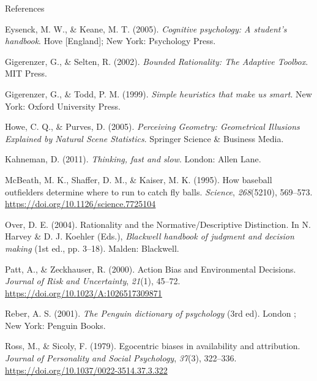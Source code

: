\documentclass[
  ignorenonframetext,
]{beamer}
\newlength{\cslhangindent}
\newlength{\cslentryspacingunit} %
\newenvironment{CSLReferences}[2] %
 {%
  \setlength{\parindent}{0pt}
  \ifodd #1
  \let\oldpar\par
  \def\par{\hangindent=\cslhangindent\oldpar}
  \fi
  \setlength{\parskip}{#2\cslentryspacingunit}
 }%
 {}
\begin{document}
\begin{frame}{References}
\begin{CSLReferences}{1}{0}
\leavevmode{}%
Eysenck, M. W., \& Keane, M. T. (2005). \emph{Cognitive psychology: A
student's handbook}. {Hove {[}England{]}; New York}: {Psychology Press}.

\leavevmode{}%
Gigerenzer, G., \& Selten, R. (2002). \emph{Bounded {Rationality}: {The
Adaptive Toolbox}}. {MIT Press}.

\leavevmode{}%
Gigerenzer, G., \& Todd, P. M. (1999). \emph{Simple heuristics that make
us smart}. {New York}: {Oxford University Press}.

\leavevmode{}%
Howe, C. Q., \& Purves, D. (2005). \emph{Perceiving {Geometry}:
{Geometrical Illusions Explained} by {Natural Scene Statistics}}.
{Springer Science \& Business Media}.

\leavevmode{}%
Kahneman, D. (2011). \emph{Thinking, fast and slow}. {London}: {Allen
Lane}.

\leavevmode{}%
McBeath, M. K., Shaffer, D. M., \& Kaiser, M. K. (1995). How baseball
outfielders determine where to run to catch fly balls. \emph{Science},
\emph{268}(5210), 569--573.
\url{https://doi.org/10.1126/science.7725104}

\leavevmode{}%
Over, D. E. (2004). Rationality and the {Normative}/{Descriptive
Distinction}. In N. Harvey \& D. J. Koehler (Eds.), \emph{Blackwell
handbook of judgment and decision making} (1st ed., pp. 3--18).
{Malden}: {Blackwell}.

\leavevmode{}%
Patt, A., \& Zeckhauser, R. (2000). Action {Bias} and {Environmental
Decisions}. \emph{Journal of Risk and Uncertainty}, \emph{21}(1),
45--72. \url{https://doi.org/10.1023/A:1026517309871}

\leavevmode{}%
Reber, A. S. (2001). \emph{The {Penguin} dictionary of psychology} (3rd
ed). {London ; New York}: {Penguin Books}.

\leavevmode{}%
Ross, M., \& Sicoly, F. (1979). Egocentric biases in availability and
attribution. \emph{Journal of Personality and Social Psychology},
\emph{37}(3), 322--336. \url{https://doi.org/10.1037/0022-3514.37.3.322}


\end{CSLReferences}
\end{frame}
\end{document}
